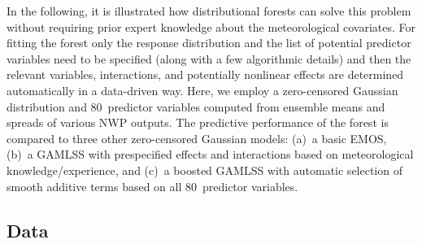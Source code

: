 \documentclass[aoas, preprint]{imsart}
\numberwithin{equation}{subsection}
\begin{document}
In the following, it is illustrated how distributional forests can
solve this problem without requiring prior expert knowledge about the 
meteorological covariates.
For fitting the forest only the response distribution and the list of potential predictor
variables need to be specified (along with a few algorithmic details) and then
the relevant variables, interactions, and potentially nonlinear effects are
determined automatically in a data-driven way. Here, we employ a zero-censored
Gaussian distribution and 80~predictor variables computed from ensemble means
and spreads of various NWP outputs. The predictive performance of the forest is
compared to three other zero-censored Gaussian models: (a)~a basic
EMOS, (b)~a GAMLSS with prespecified effects and interactions based on
meteorological knowledge/experience, and (c)~a boosted GAMLSS with automatic
selection of smooth additive terms based on all 80~predictor variables.

\subsection{Data}
\label{sec:data}
\end{document}
